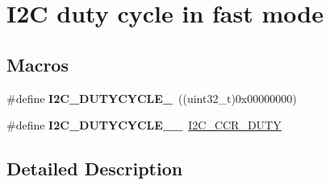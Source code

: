 \hypertarget{group___i2_c__duty__cycle__in__fast__mode}{\section{I2\-C duty cycle in fast mode}
\label{group___i2_c__duty__cycle__in__fast__mode}
}
\subsection*{Macros}
\begin{DoxyCompactItemize}
\item 
\hypertarget{group___i2_c__duty__cycle__in__fast__mode_ga414df076d339793a7c761033346fd4ca}{\#define {\bfseries I2\-C\-\_\-\-D\-U\-T\-Y\-C\-Y\-C\-L\-E\-\_}~((uint32\-\_\-t)0x00000000)}\label{group___i2_c__duty__cycle__in__fast__mode_ga414df076d339793a7c761033346fd4ca}

\item 
\hypertarget{group___i2_c__duty__cycle__in__fast__mode_gae9d1f8a140f052c1fcbcd87b4181f78d}{\#define {\bfseries I2\-C\-\_\-\-D\-U\-T\-Y\-C\-Y\-C\-L\-E\-\_\-\_}~\hyperlink{group___peripheral___registers___bits___definition_ga851c8a6b598d54c1a805b1632a4078e5}{I2\-C\-\_\-\-C\-C\-R\-\_\-\-D\-U\-T\-Y}}\label{group___i2_c__duty__cycle__in__fast__mode_gae9d1f8a140f052c1fcbcd87b4181f78d}

\end{DoxyCompactItemize}


\subsection{Detailed Description}
